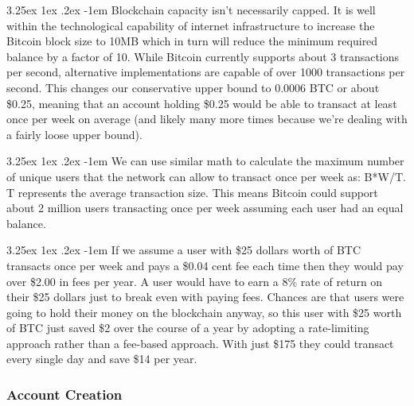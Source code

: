 \documentclass{article}
\makeatletter
\newcounter{subsubsubsection}[subsubsection]
\renewcommand\paragraph{\@startsection{paragraph}{5}{\z@}%
  {3.25ex \@plus1ex \@minus.2ex}%
  {-1em}%
  {\normalfont\normalsize\bfseries}}
\makeatother
\begin{document}

                    \paragraph{}
                        Blockchain capacity isn't necessarily capped. It is well within the technological capability of internet infrastructure to increase the Bitcoin block size to 10MB which in turn will reduce the minimum required balance by a factor of 10. While Bitcoin currently supports about 3 transactions per second, alternative implementations are capable of over 1000 transactions per second. This changes our conservative upper bound to 0.0006 BTC or about \$0.25, meaning that an account holding \$0.25 would be able to transact at least once per week on average (and likely many more times because we're dealing with a fairly loose upper bound).


                    \paragraph{}
                        We can use similar math to calculate the maximum number of unique users that the network can allow to transact once per week as: B*W/T. T represents the average transaction size. This means Bitcoin could support about 2 million users transacting once per week assuming each user had an equal balance.


                    \paragraph{}
                        If we assume a user with \$25 dollars worth of BTC transacts once per week and pays a \$0.04 cent fee each time then they would pay over \$2.00 in fees per year. A user would have to earn a 8\% rate of return on their \$25 dollars just to break even with paying fees. Chances are that users were going to hold their money on the blockchain anyway, so this user with \$25 worth of BTC just saved \$2 over the course of a year by adopting a rate-limiting approach rather than a fee-based approach. With just \$175 they could transact every single day and save \$14 per year.

            \subsubsection{Account Creation}
\end{document}
